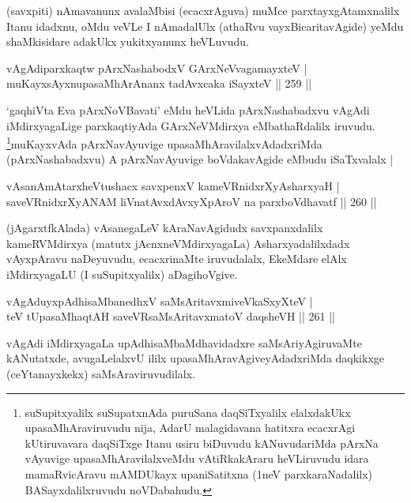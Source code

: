 \begin{artha}
(savxpiti) nAmavanunx avalaMbisi (ecacxrAguva) muMce parxtayxgAtamxnalilx Itanu idadxnu, oMdu veVLe I nAmadalUlx (athaRvu vayxBicaritavAgide) yeMdu shaMkisidare adakUkx yukitxyanunx heVLuvudu.
\end{artha}


\begin{shl}
vAgAdiparxkaqtw pArxNashabodxV GArxNeV\s vagamayxteV |\\
muKayxsAyxnupasaMhArAnanx tadAvxcaka iSayxteV \hfill || 259 ||
\end{shl}

\begin{artha}
`gaqhiVta Eva pArxNoVBavati' eMdu heVLida pArxNashabadxvu vAgAdi 
iMdirxyagaLige parxkaqtiyAda GArxNeVMdirxya eMbathaRdalilx iruvudu. 
\footnote{suSupitxyalilx suSupatxnAda puruSana daqSiTxyalilx 
elalxdakUkx upasaMhAraviruvudu nija, AdarU malagidavana hatitxra ecacxrAgi kUtiruvavara daqSiTxge Itanu usiru biDuvudu kANuvudariMda pArxNa vAyuvige upasaMhAravilalxveMdu vAtiRkakAraru heVLiruvudu idara mamaRvicAravu mAMDUkayx upaniSatitxna (1neV parxkaraNadalilx) BASayxdalilxruvudu noVDabahudu.}muKayxvAda pArxNavAyuvige upasaMhAravilalxvAdadxriMda (pArxNashabadxvu) A pArxNavAyuvige boVdakavAgide eMbudu iSaTxvalalx |
\end{artha}

\begin{shl}
vAsanAmAtarxheVtushacx savxpenxV kameVRnidxrXyAsharxyaH |\\
saveVRnidxrXyANAM liVnatAvxdAvxyXpAroV na parxboVdhavatf \hfill || 260 ||
\end{shl}

\begin{artha}
(jAgarxtfkAlada) vAsanegaLeV kAraNavAgidudx savxpanxdalilx  kameRVMdirxya (matutx jAcnxneVMdirxyagaLa) Asharxyadalilxdadx vAyxpAravu naDeyuvudu, ecacxrinaMte iruvudalalx, EkeMdare elAlx iMdirxyagaLU (I suSupitxyalilx) aDagihoVgive.
\end{artha}

\begin{shl}
vAgAduyxpAdhisaMbanedhxV saMsAritavxmiveVkaSxyXteV |\\
teV tUpasaMhaqtAH saveVR\s saMsAritavxmatoV daqsheVH \hfill || 261 ||
\end{shl}

\begin{artha}
vAgAdi iMdirxyagaLa upAdhisaMbaMdhavidadxre saMsAriyAgiruvaMte kANutatxde, avugaLelalxvU ililx upasaMhAravAgiveyAdadxriMda daqkikxge (ceYtanayxkekx) saMsAraviruvudilalx.
\end{artha}

